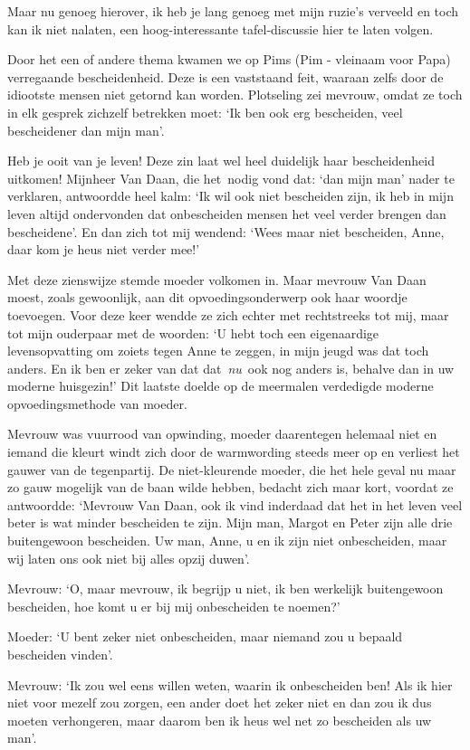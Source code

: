 \documentclass{book}
\begin{document}
Maar nu genoeg hierover, ik heb je lang genoeg met mijn ruzie's verveeld
en toch kan ik niet nalaten, een hoog-interessante tafel-discussie hier
te laten volgen.

Door het een of andere thema kwamen we op Pims (Pim - vleinaam voor
Papa) verregaande bescheidenheid. Deze is een vaststaand feit, waaraan
zelfs door de idiootste mensen niet getornd kan worden. Plotseling zei
mevrouw, omdat ze toch in elk gesprek zichzelf betrekken moet: `Ik ben
ook erg bescheiden, veel bescheidener dan mijn man'.

Heb je ooit van je leven! Deze zin laat wel heel duidelijk haar
bescheidenheid uitkomen! Mijnheer Van Daan, die het~nodig vond dat: `dan
mijn man' nader te verklaren, antwoordde heel kalm: `Ik wil ook niet
bescheiden zijn, ik heb in mijn leven altijd ondervonden dat
onbescheiden mensen het veel verder brengen dan bescheidene'. En dan
zich tot mij wendend: `Wees maar niet bescheiden, Anne, daar kom je heus
niet verder mee!'

Met deze zienswijze stemde moeder volkomen in. Maar mevrouw Van Daan
moest, zoals gewoonlijk, aan dit opvoedingsonderwerp ook haar woordje
toevoegen. Voor deze keer wendde ze zich echter met rechtstreeks tot
mij, maar tot mijn ouderpaar met de woorden: `U hebt toch een
eigenaardige levensopvatting om zoiets tegen Anne te zeggen, in mijn
jeugd was dat toch anders. En ik ben er zeker van dat dat~\emph{nu}~ook
nog anders is, behalve dan in uw moderne huisgezin!' Dit laatste doelde
op de meermalen verdedigde moderne opvoedingsmethode van moeder.

Mevrouw was vuurrood van opwinding, moeder daarentegen helemaal niet en
iemand die kleurt windt zich door de warmwording steeds meer op en
verliest het gauwer van de tegenpartij. De niet-kleurende moeder, die
het hele geval nu maar zo gauw mogelijk van de baan wilde hebben,
bedacht zich maar kort, voordat ze antwoordde: `Mevrouw Van Daan, ook ik
vind inderdaad dat het in het leven veel beter is wat minder bescheiden
te zijn. Mijn man, Margot en Peter zijn alle drie buitengewoon
bescheiden. Uw man, Anne, u en ik zijn niet onbescheiden, maar wij laten
ons ook niet bij alles opzij duwen'.

Mevrouw: `O, maar mevrouw, ik begrijp u niet, ik ben werkelijk
buitengewoon bescheiden, hoe komt u er bij mij onbescheiden te noemen?'

Moeder: `U bent zeker niet onbescheiden, maar niemand zou u bepaald
bescheiden vinden'.

Mevrouw: `Ik zou wel eens willen weten, waarin ik onbescheiden ben! Als
ik hier niet voor mezelf zou zorgen, een ander doet het zeker niet en
dan zou ik dus moeten verhongeren, maar daarom ben ik heus wel net zo
bescheiden als uw man'.
\end{document}
